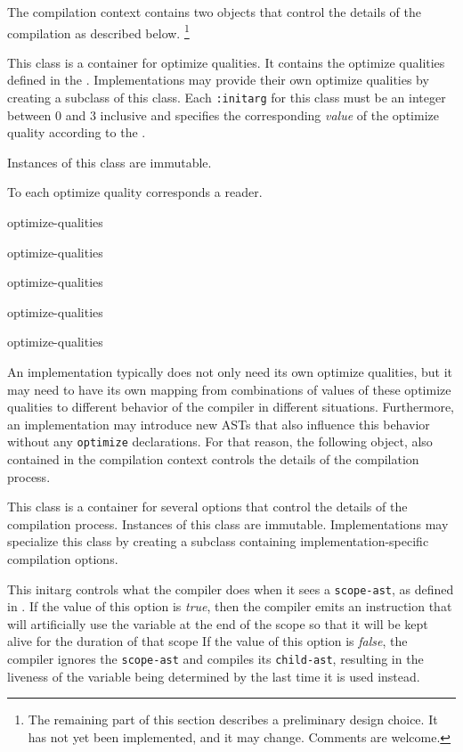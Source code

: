 The compilation context contains two objects that control the details
of the compilation as described below.%
\footnote{The remaining part of this section describes a preliminary
  design choice.  It has not yet been implemented, and it may change.
  Comments are welcome.}


This class is a container for optimize qualities.  It contains the
optimize qualities defined in the \hs{}.  Implementations may provide
their own optimize qualities by creating a subclass of this class.
Each \texttt{:initarg} for this class must be an integer between $0$ and
$3$ inclusive and specifies the corresponding \emph{value} of the
optimize quality according to the \hs{}.

Instances of this class are immutable.






To each optimize quality corresponds a reader.

 {optimize-qualities}

 {optimize-qualities}

 {optimize-qualities}

 {optimize-qualities}

 {optimize-qualities}

An implementation typically does not only need its own optimize
qualities, but it may need to have its own mapping from combinations
of values of these optimize qualities to different behavior of the
compiler in different situations.  Furthermore, an implementation may
introduce new ASTs that also influence this behavior without any
\texttt{optimize} declarations.  For that reason, the following
object, also contained in the compilation context controls the details
of the compilation process.


This class is a container for several options that control the
details of the compilation process.  Instances of this class are
immutable.  Implementations may specialize this class by creating a
subclass containing implementation-specific compilation options.


This initarg controls what the compiler does when it sees a
\texttt{scope-ast}, as defined in .  If the
value of this option is \emph{true}, then the compiler emits
an instruction that will artificially use the variable at the end of
the scope so that it will be kept alive for the duration of that scope
If the value of this option is \emph{false}, the compiler ignores the
\texttt{scope-ast} and compiles its \texttt{child-ast}, resulting in
the liveness of the variable being determined by the last time it is
used instead.
